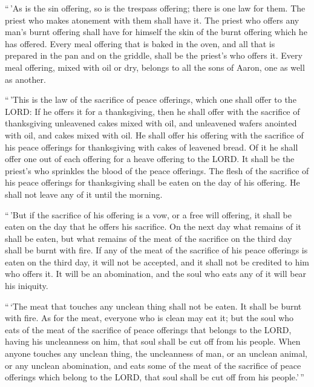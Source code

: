  ``\,'As is the sin offering, so is the trespass offering;
there is one law for them. The priest who makes atonement with them
shall have it.  The priest who offers any man's burnt
offering shall have for himself the skin of the burnt offering which he
has offered.  Every meal offering that is baked in the oven,
and all that is prepared in the pan and on the griddle, shall be the
priest's who offers it.  Every meal offering, mixed with
oil or dry, belongs to all the sons of Aaron, one as well as another.

 ``\,'This is the law of the sacrifice of peace offerings,
which one shall offer to the LORD:  If he offers it for a
thanksgiving, then he shall offer with the sacrifice of thanksgiving
unleavened cakes mixed with oil, and unleavened wafers anointed with
oil, and cakes mixed with oil.  He shall offer his offering
with the sacrifice of his peace offerings for thanksgiving with cakes of
leavened bread.  Of it he shall offer one out of each
offering for a heave offering to the LORD. It shall be the priest's who
sprinkles the blood of the peace offerings.  The flesh of
the sacrifice of his peace offerings for thanksgiving shall be eaten on
the day of his offering. He shall not leave any of it until the morning.

 ``\,'But if the sacrifice of his offering is a vow, or a
free will offering, it shall be eaten on the day that he offers his
sacrifice. On the next day what remains of it shall be eaten,
 but what remains of the meat of the sacrifice on the third
day shall be burnt with fire.  If any of the meat of the
sacrifice of his peace offerings is eaten on the third day, it will not
be accepted, and it shall not be credited to him who offers it. It will
be an abomination, and the soul who eats any of it will bear his
iniquity.

 ``\,`The meat that touches any unclean thing shall not be
eaten. It shall be burnt with fire. As for the meat, everyone who is
clean may eat it;  but the soul who eats of the meat of the
sacrifice of peace offerings that belongs to the LORD, having his
uncleanness on him, that soul shall be cut off from his people.
 When anyone touches any unclean thing, the uncleanness of
man, or an unclean animal, or any unclean abomination, and eats some of
the meat of the sacrifice of peace offerings which belong to the LORD,
that soul shall be cut off from his people.'\,''

